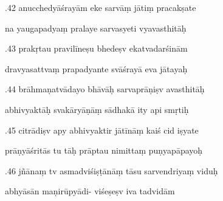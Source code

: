 \documentclass[article,12pt,a4paper]{memoir}%
\newcounter{parCount}
\begin{document}
	  
	  \pstart {}.42 anucchedyāśrayām eke sarvāṃ jātiṃ pracakṣate 
	{}
	\pend%
      

	  
	  \pstart \leavevmode%
	na yaugapadyaṃ pralaye sarvasyeti vyavasthitāḥ 
	{}
	\pend%
      

	  
	  \pstart {}.43 prakṛtau pravilīneṣu bhedeṣv ekatvadarśinām 
	{}
	\pend%
      

	  
	  \pstart \leavevmode%
	dravyasattvaṃ prapadyante svāśrayā eva jātayaḥ 
	{}
	\pend%
      

	  
	  \pstart {}.44 brāhmaṇatvādayo bhāvāḥ sarvaprāṇiṣv avasthitāḥ 
	{}
	\pend%
      

	  
	  \pstart \leavevmode%
	abhivyaktāḥ svakāryāṇāṃ sādhakā ity api smṛtiḥ 
	{}
	\pend%
      

	  
	  \pstart {}.45 citrādiṣv apy abhivyaktir jātīnāṃ kaiś cid iṣyate 
	{}
	\pend%
      

	  
	  \pstart \leavevmode%
	prāṇyāśritās tu tāḥ prāptau nimittaṃ puṇyapāpayoḥ 
	{}
	\pend%
      

	  
	  \pstart {}.46 jñānaṃ tv asmadviśiṣṭānāṃ tāsu sarvendriyaṃ viduḥ 
	{}
	\pend%
      

	  
	  \pstart \leavevmode%
	abhyāsān maṇirūpyādi- viśeṣeṣv iva tadvidām 
	{}
	\pend%
      
\end{document}
